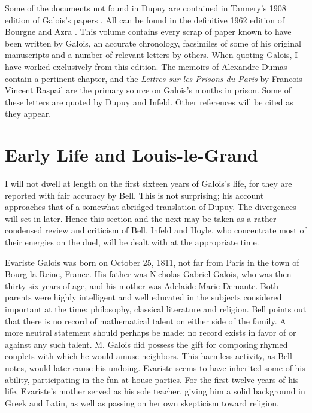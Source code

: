 \documentclass[12pt]{article}
\begin{document}
Some of the documents not found in Dupuy are contained in Tannery's 1908 edition of Galois's papers \cite{10}. All can be found in the definitive 1962 edition of Bourgne and Azra \cite{11}. This volume contains every scrap of paper known to have been written by Galois, an accurate chronology, facsimiles of some of his original manuscripts and a number of relevant letters by others. When quoting Galois, I have worked exclusively from this edition. The memoirs of Alexandre Dumas \cite{12} contain a pertinent chapter, and the \emph{Lettres sur les Prisons du Paris} by Francois Vincent Raspail \cite{13} are the primary source on Galois's months in prison. Some of these letters are quoted by Dupuy and Infeld. Other references will be cited as they appear.

\section{Early Life and Louis-le-Grand}

I will not dwell at length on the first sixteen years of Galois's life, for they are reported with fair accuracy by Bell. This is not surprising; his account approaches that of a somewhat abridged translation of Dupuy. The divergences will set in later. Hence this section and the next may be taken as a rather condensed review and criticism of Bell. Infeld and Hoyle, who concentrate most of their energies on the duel, will be dealt with at the appropriate time.

Evariste Galois was born on October 25, 1811, not far from Paris in the town of Bourg-la-Reine, France. His father was Nicholas-Gabriel Galois, who was then thirty-six years of age, and his mother was Adelaide-Marie Demante. Both parents were highly intelligent and well educated in the subjects considered important at the time: philosophy, classical literature and religion. Bell points out that there is no record of mathematical talent on either side of the family. A more neutral statement should perhaps be made: no record exists in favor of or against any such talent. M. Galois did possess the gift for composing rhymed couplets with which he would amuse neighbors. This harmless activity, as Bell notes, would later cause his undoing. Evariste seems to have inherited some of his ability, participating in the fun at house parties. For the first twelve years of his life, Evariste's mother served as his sole teacher, giving him a solid background in Greek and Latin, as well as passing on her own skepticism toward religion.
\end{document}
